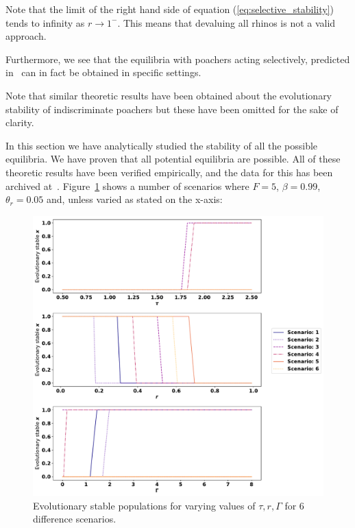 \documentclass[10pt]{article}
\begin{document}
Note that the limit of the right hand side of equation (\ref{eq:selective_stability})
tends to infinity as \(r\to1^-\). This means that devaluing all rhinos is not
a valid approach.

Furthermore, we see that the equilibria with poachers acting selectively,
predicted in~\cite{Lee} can in fact be obtained in specific settings.

Note that similar theoretic results have been obtained about the evolutionary
stability of indiscriminate poachers but these have been omitted for the sake of
clarity.

In this section we have analytically studied the stability of all the possible
equilibria. We have proven that all potential equilibria are possible.  All of
these theoretic results have been verified empirically, and the data for this
has been archived at~\cite{Glynatsi2017}.
Figure~\ref{fig:convergence-over-r} shows a number of scenarios where \(F=5\),
\(\beta=0.99\), \(\theta_r = 0.05\) and, unless varied as stated on the x-axis:

\begin{itemize}
    
\end{itemize}

\begin{figure}[!htbp]
    \includegraphics[width=\textwidth]{images/steady_populations.pdf}
    \caption{Evolutionary stable populations for varying values of \(\tau, r,
    \Gamma\) for 6 difference scenarios.}
    \label{fig:convergence-over-r}
\end{figure}
\end{document}
